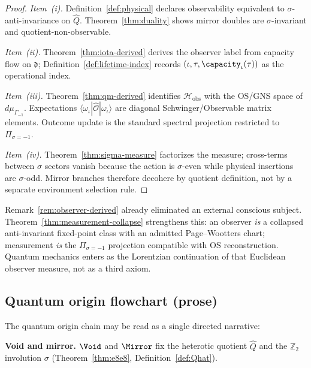 \begin{proof}
\emph{Item~(i).} Definition~\ref{def:physical} declares observability
equivalent to $\sigma$-anti-invariance on $\hat Q$. Theorem~\ref{thm:duality}
shows mirror doubles are $\sigma$-invariant and quotient-non-observable.

\emph{Item~(ii).} Theorem~\ref{thm:iota-derived} derives the observer label
from capacity flow on $\mathfrak{d}$; Definition~\ref{def:lifetime-index}
records $(\iota,\tau,\capacity_\iota(\tau))$ as the operational index.

\emph{Item~(iii).} Theorem~\ref{thm:qm-derived} identifies
$\mathcal{H}_{\mathrm{obs}}$ with the OS/GNS space of
$d\mu_{\Gamma_{-1}}$. Expectations $\langle\omega_\iota|\hat{\mathcal{O}}|\omega_\iota\rangle$
are diagonal Schwinger/Observable matrix elements. Outcome update is the
standard spectral projection restricted to $\Pi_{\sigma=-1}$.

\emph{Item~(iv).} Theorem~\ref{thm:sigma-measure} factorizes the measure;
cross-terms between $\sigma$ sectors vanish because the action is
$\sigma$-even while physical insertions are $\sigma$-odd. Mirror branches
therefore decohere by quotient definition, not by a separate environment
selection rule.
\end{proof}

\begin{remark}
Remark~\ref{rem:observer-derived} already eliminated an external conscious
subject. Theorem~\ref{thm:measurement-collapse} strengthens this: an observer
\emph{is} a collapsed anti-invariant fixed-point class with an admitted
Page--Wootters chart; measurement \emph{is} the $\Pi_{\sigma=-1}$ projection
compatible with OS reconstruction. Quantum mechanics enters as the
Lorentzian continuation of that Euclidean observer measure, not as a third
axiom.
\end{remark}

\subsection{Quantum origin flowchart (prose)}

The quantum origin chain may be read as a single directed narrative:

\medskip
\noindent\textbf{Void and mirror.}
$\Void$ and $\Mirror$ fix the heterotic quotient $\hat Q$ and the
$\mathbb{Z}_2$ involution $\sigma$ (Theorem~\ref{thm:e8e8},
Definition~\ref{def:Qhat}).

